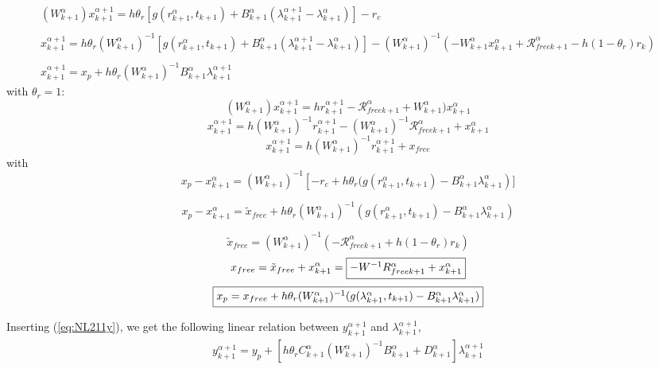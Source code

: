 \begin{equation}
   \begin{array}{l}
    (W^{\alpha}_{k+1})x^{\alpha+1}_{k+1} = h \theta _r \left[ g(r^{\alpha}_{k+1},t_{k+1}) +
    B^{\alpha}_{k+1} (\lambda^{\alpha+1}_{k+1} - \lambda^{\alpha}_{k+1}) \right] -r_c \\ \\
    x^{\alpha+1}_{k+1} = h \theta _r (W^{\alpha}_{k+1})^{-1}\left[ g(r^{\alpha}_{k+1},t_{k+1}) + B^{\alpha}_{k+1} (\lambda^{\alpha+1}_{k+1} - \lambda^{\alpha}_{k+1}) \right] -(W^{\alpha}_{k+1})^{-1}(- W^{\alpha}_{k+1} x^{\alpha}_{k+1} + \mathcal R_{free k+1} ^{\alpha} - h(1-\theta_r)r_k) \\ \\
    x^{\alpha+1}_{k+1} =  x_p + h \theta _r (W^{\alpha}_{k+1})^{-1}  B^{\alpha}_{k+1}
    \lambda^{\alpha+1}_{k+1} 

   \end{array}
\end{equation}
with $\theta _r =1$:
\[(W^{\alpha}_{k+1})x^{\alpha+1}_{k+1}= hr^{\alpha+1}_{k+1}- \mathcal R_{free k+1} ^{\alpha}+W^{\alpha}_{k+1})x^{\alpha}_{k+1}\]
\[x^{\alpha+1}_{k+1}= h(W^{\alpha}_{k+1})^{-1}r^{\alpha+1}_{k+1}- (W^{\alpha}_{k+1})^{-1} \mathcal R_{free k+1} ^{\alpha}+x^{\alpha}_{k+1}\]
\[x^{\alpha+1}_{k+1}= h(W^{\alpha}_{k+1})^{-1}r^{\alpha+1}_{k+1}+x_{free}\]
with
\begin{equation}
x_p - x^{\alpha}_{k+1} =  (W^{\alpha}_{k+1})^{-1}  \left[ -r_c + h \theta _r( g(r^{\alpha}_{k+1},t_{k+1}) -
      B^{\alpha}_{k+1} \lambda^{\alpha}_{k+1} \right)]
  \end{equation}

\[ x_p - x^{\alpha}_{k+1} = \tilde x_{free} + h \theta _r(W^{\alpha}_{k+1})^{-1}( g(r^{\alpha}_{k+1},t_{k+1}) -
      B^{\alpha}_{k+1} \lambda^{\alpha}_{k+1} ) \]
      
\[    \tilde x_{free}= (W^{\alpha}_{k+1})^{-1}(-
      \mathcal R _{free k+1} ^{\alpha} +h(1-\theta _r)r_k)\]
      \[x_{free} = \tilde x_{free} + x^{\alpha}_{k+1}=\fbox{$-W^{-1}R_{free k+1} ^{\alpha} + x^{\alpha}_{k+1}$}\]
\[ \fbox{$x_p  = x_{free} + h \theta _r(W^{\alpha}_{k+1})^{-1}( g(\lambda ^{\alpha}_{k+1},t_{k+1}) -
      B^{\alpha}_{k+1} \lambda^{\alpha}_{k+1} )$} \]

    
Inserting (\ref{eq:NL211y}), we get the following linear relation between $y^{\alpha+1}_{k+1}$ and $\lambda^{\alpha+1}_{k+1}$, 
\begin{equation}
   \begin{array}{l}
 y^{\alpha+1}_{k+1} = y_p + \left[ h \theta _r C^{\alpha}_{k+1} (W^{\alpha}_{k+1})^{-1}  B^{\alpha}_{k+1} + D^{\alpha}_{k+1} \right]\lambda^{\alpha+1}_{k+1}
   \end{array}
\end{equation}

